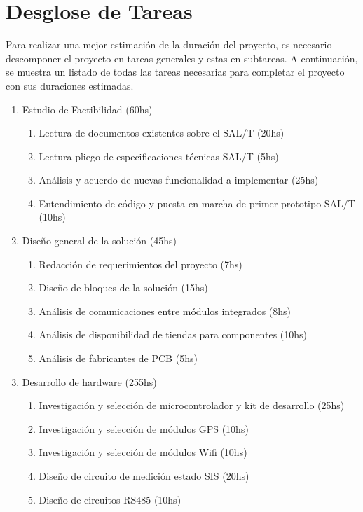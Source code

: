 \section{Desglose de Tareas}

Para realizar una mejor estimación de la duración del proyecto, es necesario descomponer el proyecto en tareas generales y estas en subtareas.  A continuación, se muestra un listado de todas las tareas necesarias para completar el proyecto con sus duraciones estimadas. 


\begin{enumerate}
    \item Estudio de Factibilidad   (60hs)
    \begin{enumerate}
        \item Lectura de documentos existentes sobre el SAL/T   (20hs)
        \item Lectura pliego de especificaciones técnicas SAL/T (5hs)
        \item Análisis y acuerdo de nuevas funcionalidad a implementar  (25hs)
        \item Entendimiento de código y puesta en marcha de primer prototipo SAL/T  (10hs)
    \end{enumerate}
    \item Diseño general de la solución (45hs)
    \begin{enumerate}
        \item Redacción de requerimientos del proyecto (7hs)
        \item Diseño de bloques de la solución (15hs)
        \item Análisis de comunicaciones entre módulos integrados (8hs)
        \item Análisis de disponibilidad de tiendas para componentes (10hs)
        \item Análisis de fabricantes de PCB (5hs)
    \end{enumerate}
    \item Desarrollo de hardware (255hs)
    \begin{enumerate}
        \item Investigación y selección de microcontrolador y kit de desarrollo (25hs)
        \item Investigación y selección de módulos GPS (10hs)
        \item Investigación y selección de módulos Wifi (10hs)
        \item Diseño de circuito de medición estado SIS (20hs)
        \item Diseño de circuitos RS485 (10hs)

\end{enumerate}
\end{enumerate}
